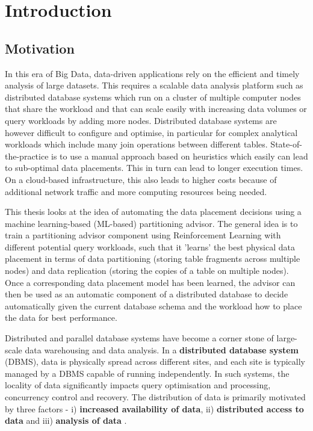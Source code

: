 \chapter{Introduction}

\section{Motivation}

In this era of Big Data, data-driven applications rely on the efficient and timely analysis of large datasets. This requires a scalable data analysis platform such as distributed database systems which run on a cluster of multiple computer nodes that share the workload and that can scale easily with increasing data volumes or query workloads by adding more nodes. Distributed database systems are however difficult to configure and optimise, in particular for complex analytical workloads which include many join operations between different tables. State-of-the-practice is to use a manual approach based on heuristics which easily can lead to sub-optimal data placements. This in turn can lead to longer execution times. On a cloud-based infrastructure, this also leads to higher costs because of additional network traffic and more computing resources being needed. 

This thesis looks at the idea of automating the data placement decisions using a machine learning-based (ML-based) partitioning advisor. The general idea is to train a partitioning advisor component using Reinforcement Learning with different potential query workloads, such that it 'learns' the best physical data placement in terms of data partitioning (storing table fragments across multiple nodes) and data replication (storing the copies of a table on multiple nodes). Once a corresponding data placement model has been learned, the advisor can then be used as an automatic component of a distributed database to decide automatically given the current database schema and the workload how to place the data for best performance.


Distributed and parallel database systems have become a corner stone of large-scale data warehousing and data analysis. In a \textbf{distributed database system} (DBMS), data is physically spread across different sites, and each site is typically managed by a DBMS capable of running independently. In such systems, the locality of data significantly impacts query optimisation and processing, concurrency control and recovery. The distribution of data is primarily motivated by three factors - i) \textbf{increased availability of data}, ii) \textbf{distributed access to data} and iii) \textbf{analysis of data} \cite{Ramakrishnan:2002:DMS:560733}. 

